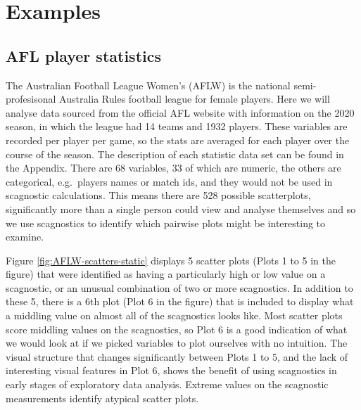 \hypertarget{examples}{%
\section{Examples}\label{examples}}

\hypertarget{afl-player-statistics}{%
\subsection{AFL player statistics}\label{afl-player-statistics}}

The Australian Football League Women's (AFLW) is the national
semi-profesisonal Australia Rules football league for female players.
Here we will analyse data sourced from the official AFL website with
information on the 2020 season, in which the league had 14 teams and
1932 players. These variables are recorded per player per game, so the
stats are averaged for each player over the course of the season. The
description of each statistic data set can be found in the Appendix.
There are 68 variables, 33 of which are numeric, the others are
categorical, e.g.~players names or match ids, and they would not be used
in scagnostic calculations. This means there are 528 possible
scatterplots, significantly more than a single person could view and
analyse themselves and so we use scagnostics to identify which pairwise
plots might be interesting to examine.

Figure \ref{fig:AFLW-scatters-static} displays 5 scatter plots (Plots 1
to 5 in the figure) that were identified as having a particularly high
or low value on a scagnostic, or an unusual combination of two or more
scagnostics. In addition to these 5, there is a 6th plot (Plot 6 in the
figure) that is included to display what a middling value on almost all
of the scagnostics looks like. Most scatter plots score middling values
on the scagnostics, so Plot 6 is a good indication of what we would look
at if we picked variables to plot ourselves with no intuition. The
visual structure that changes significantly between Plots 1 to 5, and
the lack of interesting visual features in Plot 6, shows the benefit of
using scagnostics in early stages of exploratory data analysis. Extreme
values on the scagnostic measurements identify atypical scatter plots.

